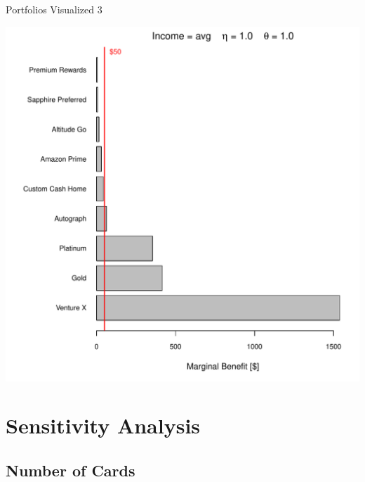 \begin{frame}{Portfolios Visualized 3}
    \begin{center}
        \includegraphics[width=0.9\textheight]{../Figures/Portfolio_avg_9_1_1.pdf}
    \end{center}
\end{frame} 


\section{Sensitivity Analysis}

\subsection{Number of Cards}

